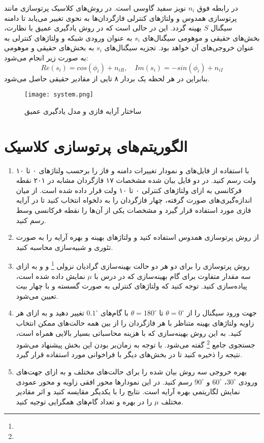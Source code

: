 \documentclass{utsignal}
\begin{document}
    در رابطه فوق
    $n_i$
    نویز سفید گاوسی است. در روش‌های کلاسیک پرتوسازی مانند پرتوسازی همدوس و 
    ولتاژهای کنترلی فازگردان‌ها به نحوی تغییر می‌یابد تا دامنه سیگنال
    $S$
    بهینه گردد. این در حالی است که در روش یادگیری عمیق با نظارت، بخش‌های حقیقی و موهومی سیگنال‌های
    $s_i$
    به عنوان ورودی شبکه و ولتاژهای کنترلی به عنوان خروجی‌های آن خواهد بود. تجزیه سیگنال‌های
    $s_i$
    به بخش‌های حقیقی و موهومی به صورت زیر انجام می‌شود:
    \begin{equation}
    	Re(s_i) = cos(\phi_i) + n_{iR}, \quad Im(s_i) = -sin(\phi_i) + n_{iI}
    \end{equation}
    بنابراین در هر لحظه یک بردار ۸ تایی از مقادیر حقیقی حاصل می‌شود.
    \begin{figure}[H]
    	\centering
    	\texttt{[image: system.png]}
    	\caption{ساختار آرایه فازی و مدل یادگیری عمیق}
    	\label{fig:system}
    \end{figure}
    \section{الگوریتم‌های پرتوسازی کلاسیک}
    \begin{enumerate}
    	\item با استفاده از فایل‌های
    	و
    	نمودار تغییرات دامنه و فاز را برحسب ولتاژهای ۰ تا ۱۰ ولت رسم کنید. در دو فایل بیان شده مشخصات ۱۷ فازگردان مشابه در ۲۰۱ نقطه فرکانسی به ازای ولتاژهای کنترلی ۰ تا ۱۰ ولت قرار داده شده است. از میان اندازه‌گیری‌های صورت گرفته، چهار فازگردان را به دلخواه انتخاب کنید تا در آرایه فازی مورد استفاده قرار گیرد و مشخصات یکی از آن‌ها را نقطه فرکانسی وسط رسم کنید.
    	\item از روش پرتوسازی همدوس استفاده کنید و ولتاژهای بهینه و بهره آرایه را به صورت تئوری و شبیه‌سازی محاسبه کنید.
    	\item روش پرتوسازی
    	را برای دو هر دو حالت بهینه‌سازی گرادیان نزولی
    	\footnote{}
    	و
    	و به ازای سه مقدار متفاوت برای گام بهینه‌سازی که در درس با
    	$\mu$
    	نمایش داده شده است، پیاده‌سازی کنید. توجه کنید که ولتاژهای کنترلی به صورت گسسته و با چهار بیت تعیین می‌شود.
    	\item جهت ورود سیگنال را از
    	$\theta = 0^{\circ}$
    	تا
    	$\theta = 180^{\circ}$
    	با گام‌های
    	$0.1^{\circ}$
    	تغییر دهید و به ازای هر زاویه ولتاژهای بهینه متناظر با هر فازگردان را از بین همه حالت‌های ممکن انتخاب کنید. به این روش بهینه‌سازی که با هزینه محاسباتی بسیار بالایی همراه است، جستجوی جامع
    	\footnote{}
    	گفته می‌شود. با توجه به زمان‌بر بودن این بخش پیشنهاد می‌شود نتیجه را ذخیره کنید تا در بخش‌های دیگر با فراخوانی مورد استفاده قرار گیرد.
    	\item بهره خروجی سه روش بیان شده را برای حالت‌های مختلف و به ازای جهت‌های ورودی
    	$30^{\circ}$،
    	$60^{\circ}$
    	و
    	$90^{\circ}$
    	رسم کنید. در این نمودارها محور افقی زاویه و محور عمودی نمایش لگاریتمی بهره آرایه است. نتایج را با یکدیگر مقایسه کنید و اثر مقادیر مختلف
    	$\mu$
    را در بهره و تعداد گام‌های همگرایی توجیه کنید.
    \end{enumerate}
\end{document}
